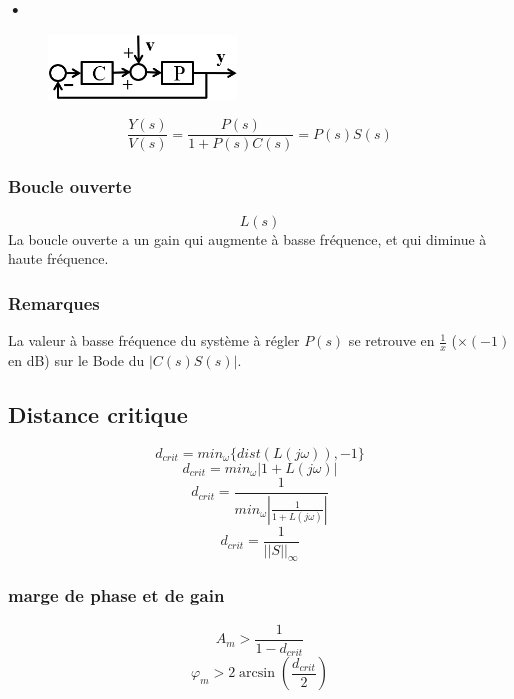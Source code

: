 \documentclass[resume]{subfiles}
\begin{document}
\subsubsection{•}
\begin{figure}[H]
\centering
\includegraphics[width=5.00cm]{img_11.png}
\end{figure}
$$\frac{Y(s)}{V(s)}=\frac{P(s)}{1+P(s)C(s)}=P(s)S(s)$$
\subsubsection{Boucle ouverte}
$$L(s)$$
La boucle ouverte a un gain qui augmente à basse fréquence, et qui diminue à haute fréquence.
\subsubsection{Remarques}
La valeur à basse fréquence du système à régler $P(s)$ se retrouve en $\frac{1}{x}$ ($\times (-1)$ en dB) sur le Bode du $|C(s)S(s)|$.

\subsection{Distance critique}

$$d_{crit} = min_{\omega}\{dist(L(j\omega)), -1\}$$
$$d_{crit} = min_{\omega}|1+L(j\omega)|$$
$$d_{crit} = \frac{1}{min_{\omega}|\frac{1}{1+L(j\omega)}|}$$
$$d_{crit} = \frac{1}{||S||_\infty}$$

\subsubsection{marge de phase et de gain}
$$A_m > \frac{1}{1-d_{crit}}$$
$$\varphi_m > 2\arcsin(\frac{d_{crit}}{2})$$
\end{document}

